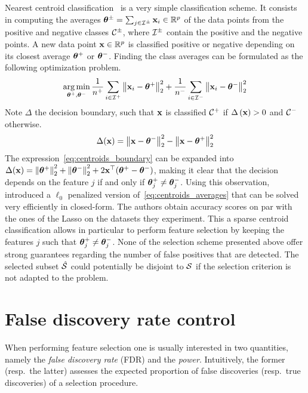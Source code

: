 Nearest centroid classification~\cite{centroid_classification} is a very simple classification scheme.
It consists in computing the averages $\bm{\theta}^\pm = \sum_{j \in \mathcal{I}^\pm} \mathbf{x}_i \in \mathbb{R}^p$
of the data points from the positive and negative classes $\mathcal{C}^\pm$,
where $\mathcal{I}^\pm$ contain the positive and the negative points.
A new data point $\mathbf{x} \in \mathbb{R}^p$ is classified positive or negative depending on its closest average
$\bm{\theta}^+$ or $\bm{\theta}^-$.
Finding the class averages can be formulated as the following optimization problem.
\begin{equation}\label{eq:centroids_averages}
    \operatorname*{arg\,min}_{\bm{\theta}^+, \bm{\theta}^-}
        \frac{1}{n^+} \sum_{i \in \mathcal{I}^+} \big\lVert \mathbf{x}_i - \bm{\theta}^+ \big\rVert^2_2
        + \frac{1}{n^-} \sum_{i \in \mathcal{I}^-} \big\lVert \mathbf{x}_i - \bm{\theta}^- \big\rVert^2_2
\end{equation}
Note $\Delta$ the decision boundary,
such that $\mathbf{x}$ is classified $\mathcal{C}^+$ if $\Delta\left( \mathbf{x} \right) > 0$ and $\mathcal{C}^-$ otherwise.
\begin{equation}\label{eq:centroids_boundary}
    \Delta(\mathbf{x}) = \left\lVert\mathbf{x} - \bm{\theta}^-\right\rVert^2_2 - \left\lVert\mathbf{x} - \bm{\theta}^+\right\rVert^2_2
\end{equation}
The expression~\ref{eq:centroids_boundary} can be expanded into
$\Delta(\mathbf{x}) = \left\lVert\bm{\theta}^+\right\rVert^2_2 + \left\lVert\bm{\theta}^-\right\rVert^2_2 + 2\mathbf{x}^\top(\bm{\theta}^+ - \bm{\theta}^-)$,
making it clear that the decision depends on the feature $j$ if and only if $\bm{\theta}^+_j \neq \bm{\theta}^-_j$.
Using this observation,\cite{sparse_center_classifiers} introduced a $\ell_0$ penalized version
of~\ref{eq:centroids_averages} that can be solved very efficiently in closed-form.
The authors obtain accuracy scores on par with the ones of the Lasso on the datasets they experiment.
This a sparse centroid classification allows in particular to perform feature selection
by keeping the features $j$ such that $\bm{\theta}^+_j \neq \bm{\theta}^-_j$.
%
\bigbreak
None of the selection scheme presented above offer strong guarantees regarding
the number of false positives that are detected.
The selected subset $\hat{\mathcal{S}}$ could potentially be disjoint to $\mathcal{S}$
if the selection criterion is not adapted to the problem.

\section{False discovery rate control}\label{sec:fdrc}

When performing feature selection one is usually interested in two quantities,
namely the \emph{false discovery rate} (FDR) and the \emph{power}.
Intuitively, the former (resp.\ the latter) assesses the expected proportion of false discoveries
(resp.\ true discoveries) of a selection procedure.

